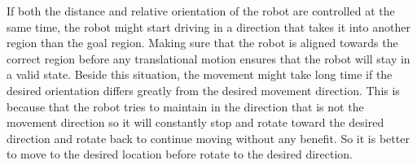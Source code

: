 If both the distance and relative orientation of the robot are controlled at the same time, the robot might start driving in a direction that takes it into another region than the goal region. Making sure that the robot is aligned towards the correct region before any translational motion ensures that the robot will stay in a valid state. Beside this situation, the movement might take long time if the desired orientation differs greatly from the desired movement direction. This is because that the robot tries to maintain in the direction that is not the movement direction so it will constantly stop and rotate toward the desired direction and rotate back to continue moving without any benefit. So it is better to move to the desired location before rotate to the desired direction. 